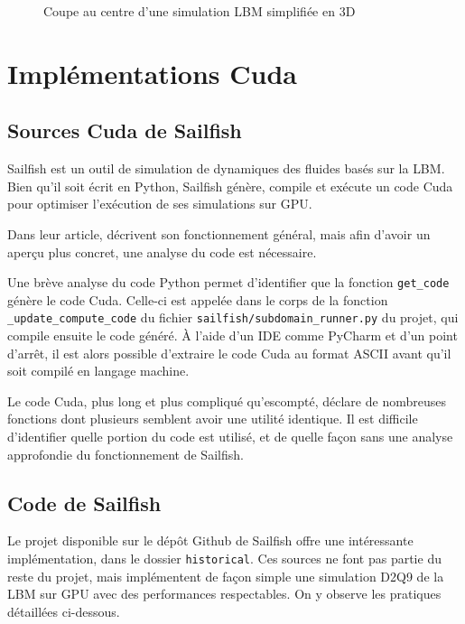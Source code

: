 \begin{figure}[h]
{		\label{fig:lbm_simple_3d_460}
	}
	\caption{Coupe au centre d'une simulation \ac{LBM} simplifiée en 3D}
	\label{fig:lbm_simple_3d}
\end{figure}

\section{Implémentations Cuda}
\subsection{Sources Cuda de Sailfish}
Sailfish est un outil de simulation de dynamiques des fluides basés sur la \ac{LBM}. Bien qu'il soit écrit en Python, Sailfish génère, compile et exécute un code Cuda pour optimiser l'exécution de ses simulations sur \acs{GPU}.

Dans leur article, \citet{januszewski_sailfish:_2014} décrivent son fonctionnement général, mais afin d'avoir un aperçu plus concret, une analyse du code est nécessaire. 

Une brève analyse du code Python permet d'identifier que la fonction \texttt{get\_code} génère le code Cuda. Celle-ci est appelée dans le corps de la fonction \texttt{\_update\_compute\_code} du fichier \texttt{sailfish/subdomain\_runner.py} du projet, qui compile ensuite le code généré. À l'aide d'un \acs{IDE} comme PyCharm et d'un point d'arrêt, il est alors possible d'extraire le code Cuda au format \acs{ASCII} avant qu'il soit compilé en langage machine.

Le code Cuda, plus long et plus compliqué qu'escompté, déclare de nombreuses fonctions dont plusieurs semblent avoir une utilité identique. Il est difficile d'identifier quelle portion du code est utilisé, et de quelle façon sans une analyse approfondie du fonctionnement de Sailfish.

\subsection{Code  de Sailfish}
Le projet disponible sur le dépôt Github de Sailfish offre une intéressante implémentation, dans le dossier \texttt{historical}. Ces sources ne font pas partie du reste du projet, mais implémentent de façon simple une simulation D2Q9 de la \acs{LBM} sur \acs{GPU} avec des performances respectables. On y observe les pratiques détaillées ci-dessous.

